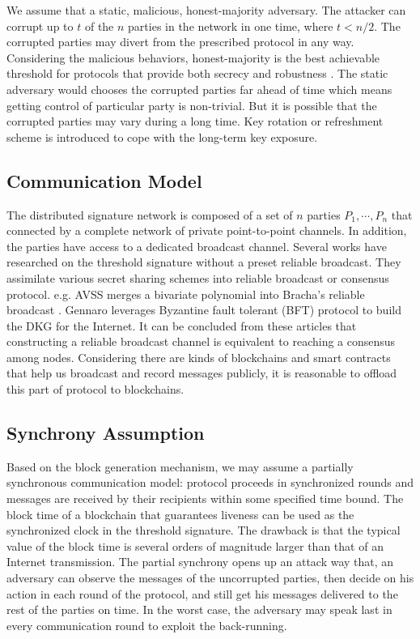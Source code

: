 \documentclass[11pt]{article}
\begin{document}
We assume that a static, malicious, honest-majority adversary. The attacker can corrupt up to $t$ of the $n$ parties in the network in one time, where $t < n/2$. The corrupted parties may divert from the prescribed protocol in any way. Considering the malicious behaviors, honest-majority is the best achievable threshold for protocols that provide both secrecy and robustness \cite{gennaro2007secure}. The static adversary would chooses the corrupted parties far ahead of time which means getting control of particular party is non-trivial. But it is possible that the corrupted parties may vary during a long time. Key rotation or refreshment scheme is introduced to cope with the long-term key exposure.

\subsection{Communication Model}

The distributed signature network is composed of a set of $n$ parties $P_1, \cdots, P_n$ that connected by a complete network of private point-to-point channels. In addition, the parties have access to a dedicated broadcast channel. Several works\cite{kate2009distributed,kate2012distributed,cachin2002asynchronous} have researched on the threshold signature without a preset reliable broadcast. They assimilate various secret sharing schemes into reliable broadcast or consensus protocol. e.g. AVSS\cite{cachin2002asynchronous} merges a bivariate polynomial into Bracha’s reliable broadcast \cite{bracha1984asynchronous}. Gennaro\cite{gennaro2007secure} leverages Byzantine fault tolerant (BFT) protocol\cite{castro1999practical} to build the DKG for the Internet. It can be concluded from these articles that constructing a reliable broadcast channel is equivalent to reaching a consensus among nodes. Considering there are kinds of blockchains and smart contracts that help us broadcast and record messages publicly, it is reasonable to offload this part of protocol to blockchains.

\subsection{Synchrony Assumption}

Based on the block generation mechanism, we may assume a partially synchronous communication model: protocol proceeds in synchronized rounds and messages are received by their recipients within some specified time bound. The block time of a blockchain that guarantees liveness can be used as the synchronized clock in the threshold signature. The drawback is that the typical value of the block time is several orders of magnitude larger than that of an Internet transmission. The partial synchrony opens up an attack way that, an adversary can observe the messages of the uncorrupted parties, then decide on his action in each round of the protocol, and still get his messages delivered to the rest of the parties on time. In the worst case, the adversary may speak last in every communication round to exploit the back-running\cite{gennaro2007secure}.
\end{document}
